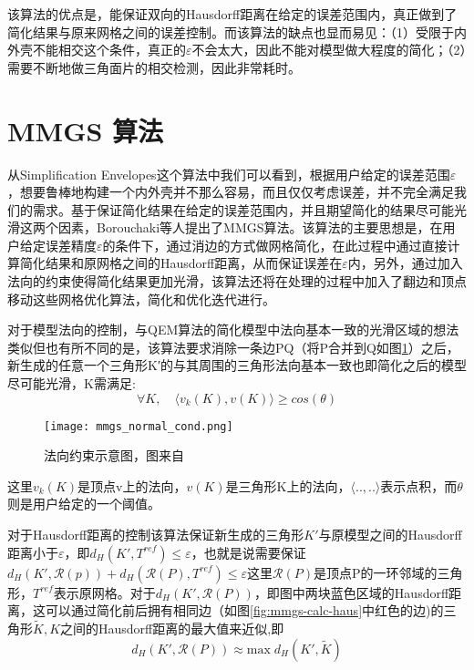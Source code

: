 该算法的优点是，能保证双向的Hausdorff距离在给定的误差范围内，真正做到了简化结果与原来网格之间的误差控制。而该算法的缺点也显而易见：（1）受限于内外壳不能相交这个条件，真正的$\varepsilon$不会太大，因此不能对模型做大程度的简化；（2）需要不断地做三角面片的相交检测，因此非常耗时。

\section{MMGS 算法}
从Simplification Envelopes\cite{simp-envlop}这个算法中我们可以看到，根据用户给定的误差范围$\varepsilon$，想要鲁棒地构建一个内外壳并不那么容易，而且仅仅考虑误差，并不完全满足我们的需求。基于保证简化结果在给定的误差范围内，并且期望简化的结果尽可能光滑这两个因素，Borouchaki等人提出了MMGS算法\cite{mmgs}。该算法的主要思想是，在用户给定误差精度$\varepsilon$的条件下，通过消边的方式做网格简化，在此过程中通过直接计算简化结果和原网格之间的Hausdorff距离，从而保证误差在$\varepsilon$内，另外，通过加入法向的约束使得简化结果更加光滑，该算法还将在处理的过程中加入了翻边和顶点移动这些网格优化算法，简化和优化迭代进行。\par
对于模型法向的控制，与QEM算法的简化模型中法向基本一致的光滑区域的想法类似但也有所不同的是，该算法要求消除一条边PQ（将P合并到Q如图\ref{fig:mmgs-normal-cond}）之后，新生成的任意一个三角形K′的与其周围的三角形法向基本一致也即简化之后的模型尽可能光滑，K需满足:
\begin{equation}
  \forall K, \quad \langle v_k (K), v(K) \rangle \ge cos(\theta)
\end{equation}
\begin{figure}[htbp]
    \centering
    \texttt{[image: mmgs\_normal\_cond.png]}
    \caption[法向约束]{法向约束示意图，图来自\cite{mmgs}}
    \label{fig:mmgs-normal-cond}
\end{figure}
这里$v_k(K)$是顶点v上的法向，$v(K)$是三角形K上的法向，$\langle ..,.. \rangle$表示点积，而$\theta$则是用户给定的一个阈值。\par
对于Hausdorff距离的控制该算法保证新生成的三角形$K'$与原模型之间的Hausdorff距离小于$\varepsilon$，即$d_H(K',T^{ref})\le\varepsilon$，也就是说需要保证$d_H(K',\mathcal{R}(p))+d_H(\mathcal{R}(P),T^{ref}) \le \varepsilon$这里$\mathcal{R}(P)$是顶点P的一环邻域的三角形，$T^{ref}$表示原网格。对于$d_H(K',\mathcal{R}(P))$，即图中两块蓝色区域的Hausdorff距离，这可以通过简化前后拥有相同边（如图\ref{fig:mmgs-calc-haus}中红色的边)的三角形$\widetilde{K},K$之间的Hausdorff距离的最大值来近似,即
\begin{equation}
  d_H(K', \mathcal{R}(P)) \approx \text{max} \; d_H(K',\widetilde{K})
\end{equation}
